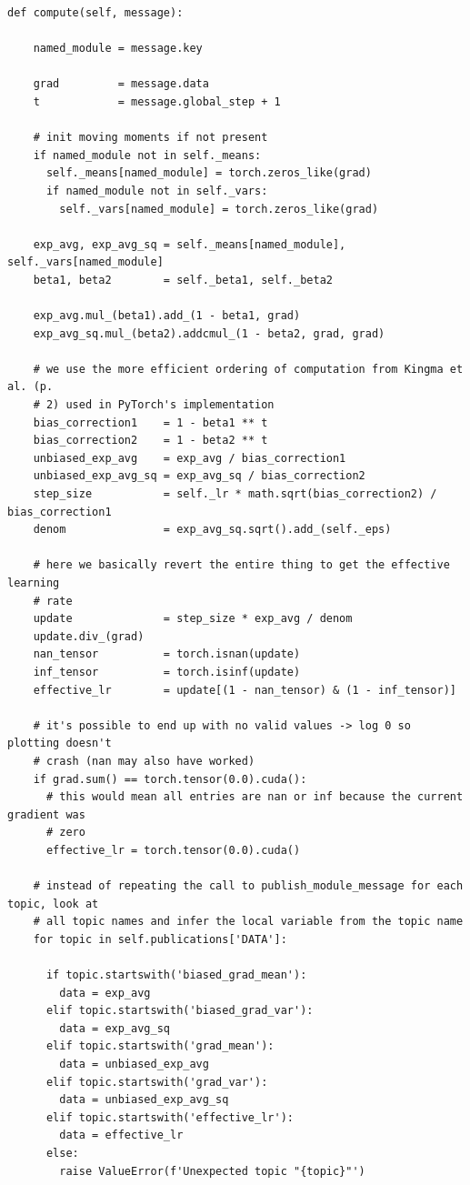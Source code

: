 \begin{lstlisting}[label={lst:running_moments_sub},
caption={Subscriber to record Adam terms}]
  def compute(self, message):

    named_module = message.key

    grad         = message.data
    t            = message.global_step + 1

    # init moving moments if not present
    if named_module not in self._means:
      self._means[named_module] = torch.zeros_like(grad)
      if named_module not in self._vars:
        self._vars[named_module] = torch.zeros_like(grad)

    exp_avg, exp_avg_sq = self._means[named_module], self._vars[named_module]
    beta1, beta2        = self._beta1, self._beta2

    exp_avg.mul_(beta1).add_(1 - beta1, grad)
    exp_avg_sq.mul_(beta2).addcmul_(1 - beta2, grad, grad)

    # we use the more efficient ordering of computation from Kingma et al. (p.
    # 2) used in PyTorch's implementation
    bias_correction1    = 1 - beta1 ** t
    bias_correction2    = 1 - beta2 ** t
    unbiased_exp_avg    = exp_avg / bias_correction1
    unbiased_exp_avg_sq = exp_avg_sq / bias_correction2
    step_size           = self._lr * math.sqrt(bias_correction2) / bias_correction1
    denom               = exp_avg_sq.sqrt().add_(self._eps)

    # here we basically revert the entire thing to get the effective learning
    # rate
    update              = step_size * exp_avg / denom
    update.div_(grad)
    nan_tensor          = torch.isnan(update)
    inf_tensor          = torch.isinf(update)
    effective_lr        = update[(1 - nan_tensor) & (1 - inf_tensor)]

    # it's possible to end up with no valid values -> log 0 so plotting doesn't
    # crash (nan may also have worked)
    if grad.sum() == torch.tensor(0.0).cuda():
      # this would mean all entries are nan or inf because the current gradient was
      # zero
      effective_lr = torch.tensor(0.0).cuda()

    # instead of repeating the call to publish_module_message for each topic, look at
    # all topic names and infer the local variable from the topic name
    for topic in self.publications['DATA']:

      if topic.startswith('biased_grad_mean'):
        data = exp_avg
      elif topic.startswith('biased_grad_var'):
        data = exp_avg_sq
      elif topic.startswith('grad_mean'):
        data = unbiased_exp_avg
      elif topic.startswith('grad_var'):
        data = unbiased_exp_avg_sq
      elif topic.startswith('effective_lr'):
        data = effective_lr
      else:
        raise ValueError(f'Unexpected topic "{topic}"')


\end{lstlisting}
